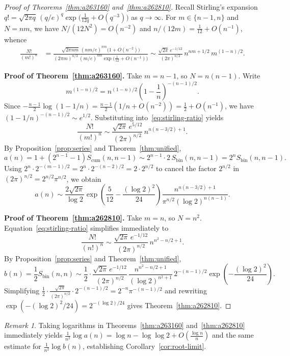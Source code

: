 \documentclass[11pt,a4paper]{article}
\theoremstyle{remark}
\newtheorem{remark}[theorem]{Remark}
\begin{document}
\begin{proof}[Proof of Theorems~\ref{thm:a263160} and~\ref{thm:a262810}]
Recall Stirling's expansion $q! = \sqrt{2\pi q}\,(q/e)^q \exp\!\bigl(\frac{1}{12q} + O(q^{-3})\bigr)$ as $q\to\infty$. For $m\in\{n-1,n\}$ and $N=nm$, we have $N/(12N^2)=O(n^{-2})$ and $n/(12m) = \frac{1}{12} + O(n^{-1})$, whence
\begin{align}
  \frac{N!}{(m!)^n}
  &= \frac{\sqrt{2\pi nm}\,(nm/e)^{nm}\bigl(1+O(n^{-2})\bigr)}
          {(2\pi m)^{n/2}\,(m/e)^{nm}\exp\!\bigl(\frac{1}{12}+O(n^{-1})\bigr)}
  \sim \frac{\sqrt{2\pi}\,e^{-1/12}}{(2\pi)^{n/2}}\,n^{nm+1/2}\,m^{(1-n)/2}.
  \label{eq:stirling-ratio}
\end{align}

\medskip
\noindent\textbf{Proof of Theorem~\ref{thm:a263160}.}
Take $m = n-1$, so $N = n(n-1)$. Write
\[
  m^{(1-n)/2} = n^{(1-n)/2}\left(1 - \frac{1}{n}\right)^{-(n-1)/2}.
\]
Since $-\frac{n-1}{2}\log(1-1/n) = \frac{n-1}{2}(1/n + O(n^{-2})) = \frac{1}{2} + O(n^{-1})$, we have $(1-1/n)^{-(n-1)/2} \sim e^{1/2}$. Substituting into~\eqref{eq:stirling-ratio} yields
\[
  \frac{N!}{(m!)^n}
  \sim \frac{\sqrt{2\pi}\,e^{5/12}}{(2\pi)^{n/2}}\,n^{n(n-3/2)+1}.
\]
By Proposition~\ref{prop:series} and Theorem~\ref{thm:unified},
\[
  a(n) = 1 + (2^{n-1}-1)S_{\mathrm{cum}}(n,n-1)
  \sim 2^{n-1}\cdot 2\,S_{\mathrm{bin}}(n,n-1)
  = 2^n S_{\mathrm{bin}}(n,n-1).
\]
Using $2^n \cdot 2^{-(m-1)/2} = 2^n \cdot 2^{-(n-2)/2} = 2\cdot 2^{n/2}$ to cancel the factor $2^{n/2}$ in $(2\pi)^{n/2} = 2^{n/2}\pi^{n/2}$, we obtain
\[
  a(n) \sim \frac{2\sqrt{2\pi}}{\log 2}\exp\!\left(\frac{5}{12}-\frac{(\log 2)^2}{24}\right)
  \frac{n^{n(n-3/2)+1}}{\pi^{n/2}(\log 2)^{n(n-1)}}.
\]

\medskip
\noindent\textbf{Proof of Theorem~\ref{thm:a262810}.}
Take $m = n$, so $N = n^2$. Equation~\eqref{eq:stirling-ratio} simplifies immediately to
\[
  \frac{N!}{(n!)^n}
  \sim \frac{\sqrt{2\pi}\,e^{-1/12}}{(2\pi)^{n/2}}\,n^{n^2 - n/2 + 1}.
\]
By Proposition~\ref{prop:series} and Theorem~\ref{thm:unified},
\[
  b(n) = \frac{1}{2}S_{\mathrm{bin}}(n,n)
  \sim \frac{1}{2}\cdot\frac{\sqrt{2\pi}\,e^{-1/12}}{(2\pi)^{n/2}}\,
       \frac{n^{n^2-n/2+1}}{(\log 2)^{n^2+1}}\,
       2^{-(n-1)/2}\exp\!\left(-\frac{(\log 2)^2}{24}\right).
\]
Simplifying $\frac{1}{2}\cdot\frac{\sqrt{2\pi}}{(2\pi)^{n/2}}\cdot 2^{-(n-1)/2} = 2^{-n}\pi^{-(n-1)/2}$ and rewriting $\exp(-(\log 2)^2/24) = 2^{-(\log 2)/24}$ gives Theorem~\ref{thm:a262810}.
\end{proof}

\begin{remark}
Taking logarithms in Theorems~\ref{thm:a263160} and~\ref{thm:a262810} immediately yields $\frac{1}{n^2}\log a(n) = \log n - \log\log 2 + O(\frac{\log n}{n})$ and the same estimate for $\frac{1}{n^2}\log b(n)$, establishing Corollary~\ref{cor:root-limit}.
\end{remark}
\end{document}
